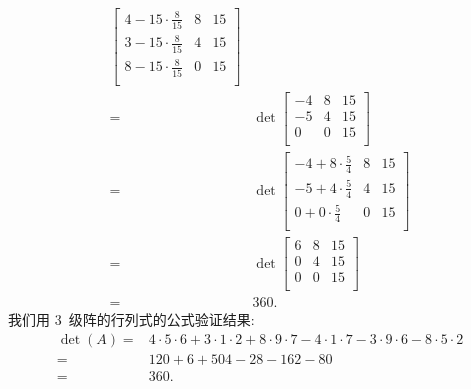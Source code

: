 \documentclass[%
    UTF8,%
    fontset=none,%
    punct=kaiming,%
    zihao=-4,%
    a4paper,%
    oneside,%
]{ctexbook}
\begin{document}
\begin{example}
\begin{align*}
{\begin{bmatrix}
                4 - 15 \cdot \frac{8}{15} & 8 & 15 \\
                3 - 15 \cdot \frac{8}{15} & 4 & 15 \\
                8 - 15 \cdot \frac{8}{15} & 0 & 15 \\
            \end{bmatrix}
        }
        \\
        = {} &
        \det {
            \begin{bmatrix}
                -4 & 8 & 15 \\
                -5 & 4 & 15 \\
                0  & 0 & 15 \\
            \end{bmatrix}
        }
        \\
        = {} &
        \det {
            \begin{bmatrix}
                -4 + 8 \cdot \frac{5}{4} & 8 & 15 \\
                -5 + 4 \cdot \frac{5}{4} & 4 & 15 \\
                0 + 0 \cdot \frac{5}{4}  & 0 & 15 \\
            \end{bmatrix}
        }
        \\
        = {} &
        \det {
            \begin{bmatrix}
                6 & 8 & 15 \\
                0 & 4 & 15 \\
                0 & 0 & 15 \\
            \end{bmatrix}
        }
        \\
        = {} &
        360.
    \end{align*}
    我们用 \(3\)~级阵的行列式的公式验证结果:
    \begin{align*}
        \det {(A)}
        = {} &
        4 \cdot 5 \cdot 6
        + 3 \cdot 1 \cdot 2
        + 8 \cdot 9 \cdot 7
        - 4 \cdot 1 \cdot 7
        - 3 \cdot 9 \cdot 6
        - 8 \cdot 5 \cdot 2
        \\
        = {} &
        120 + 6 + 504 - 28 - 162 - 80
        \\
        = {} & 360.
    \end{align*}
\end{example}
\end{document}
